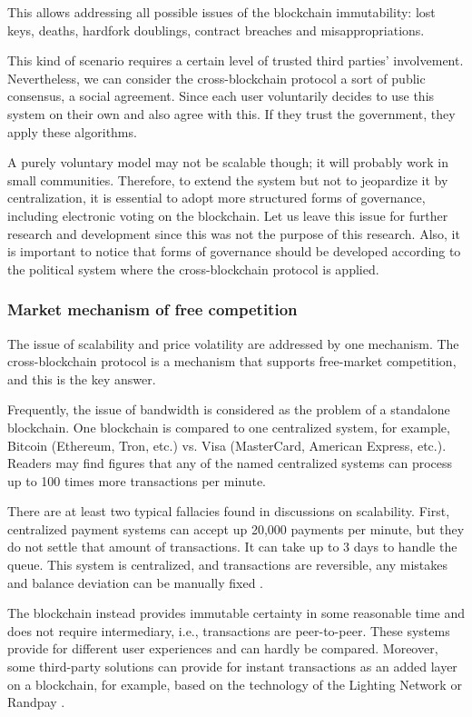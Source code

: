 \begin{multicols}{2}
This allows addressing all possible issues of the blockchain immutability: lost keys, deaths, hardfork doublings, contract breaches and misappropriations.

This kind of scenario requires a certain level of trusted third parties’ involvement. Nevertheless, we can consider the cross-blockchain protocol a sort of public consensus, a social agreement. Since each user voluntarily decides to use this system on their own and also agree with this. If they trust the government, they apply these algorithms.

A purely voluntary model may not be scalable though; it will probably work in small communities. Therefore, to extend the system but not to jeopardize it by centralization, it is essential to adopt more structured forms of governance, including electronic voting on the blockchain. Let us leave this issue for further research and development since this was not the purpose of this research. Also, it is important to notice that forms of governance should be developed according to the political system where the cross-blockchain protocol is applied.

\subsubsection{Market mechanism of free competition}\label{subsubsec-5.2.3}

The issue of scalability and price volatility are addressed by one mechanism. The cross-blockchain protocol is a mechanism that supports free-market competition, and this is the key answer.

Frequently, the issue of bandwidth is considered as the problem of a standalone blockchain. One blockchain is compared to one centralized system, for example, Bitcoin (Ethereum, Tron, etc.) vs. Visa (MasterCard, American Express, etc.). Readers may find figures that any of the named centralized systems can process up to 100 times more transactions per minute.

There are at least two typical fallacies found in discussions on scalability. First, centralized payment systems can accept up 20,000 payments per minute, but they do not settle that amount of transactions. It can take up to 3 days to handle the queue. This system is centralized, and transactions are reversible, any mistakes and balance deviation can be manually fixed \cite{art1-key45}.

The blockchain instead provides immutable certainty in some reasonable time and does not require intermediary, i.e., transactions are peer-to-peer. These systems provide for different user experiences and can hardly be compared. Moreover, some third-party solutions can provide for instant transactions as an added layer on a blockchain, for example, based on the technology of the Lighting Network \cite{art1-key46} or Randpay \cite{art1-key47}.


\end{multicols}
